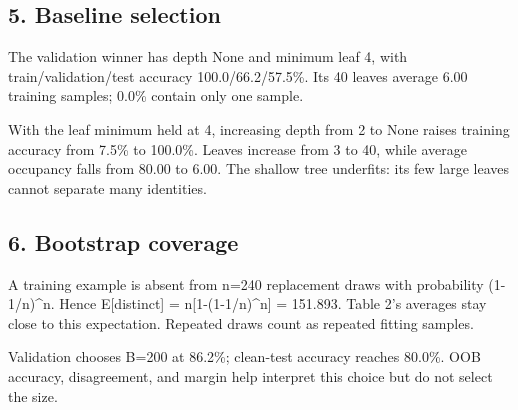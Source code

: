 \documentclass[10pt,twocolumn,letterpaper]{article}
\begin{document}
\subsection*{5. Baseline selection}
The validation winner has depth None and minimum leaf 4, with train/validation/test accuracy 100.0/66.2/57.5\%. Its 40 leaves average 6.00 training samples; 0.0\% contain only one sample.

With the leaf minimum held at 4, increasing depth from 2 to None raises training accuracy from 7.5\% to 100.0\%. Leaves increase from 3 to 40, while average occupancy falls from 80.00 to 6.00. The shallow tree underfits: its few large leaves cannot separate many identities.

\newpage
\subsection*{6. Bootstrap coverage}
A training example is absent from n=240 replacement draws with probability (1-1/n)\textasciicircum{}n. Hence E[distinct] = n[1-(1-1/n)\textasciicircum{}n] = 151.893. Table 2's averages stay close to this expectation. Repeated draws count as repeated fitting samples.

Validation chooses B=200 at 86.2\%; clean-test accuracy reaches 80.0\%. OOB accuracy, disagreement, and margin help interpret this choice but do not select the size.
\end{document}
